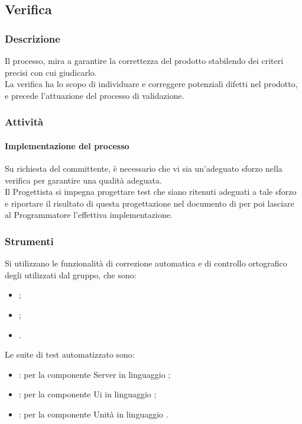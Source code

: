 \subsection{Verifica}
	\subsubsection{Descrizione}
	Il processo, mira a garantire la correttezza del prodotto stabilendo dei criteri precisi con cui giudicarlo.\\
	La verifica ha lo scopo di individuare e correggere potenziali difetti nel prodotto, e precede l'attuazione del processo di validazione.

    \subsubsection{Attività}
        \paragraph{Implementazione del processo}
        Su richiesta del committente, è necessario che vi sia un'adeguato sforzo nella verifica per garantire una qualità adeguata.\\
        Il Progettista si impegna progettare test che siano ritenuti adeguati a tale sforzo e riportare il risultato di questa progettazione nel documento di  per poi lasciare al Programmatore l'effettiva implementazione.

	\subsubsection{Strumenti}
	Si utilizzano le funzionalità di correzione automatica e di controllo ortografico degli  utilizzati dal gruppo, che sono:
	\begin{itemize}
		\item {};
		\item {};
		\item {}.
	\end{itemize}
    Le suite di test automatizzato sono:
    \begin{itemize}
        \item {}: per la componente Server in linguaggio ;
        \item {}: per la componente Ui in linguaggio ;
        \item {}: per la componente Unità in linguaggio .
    \end{itemize}

